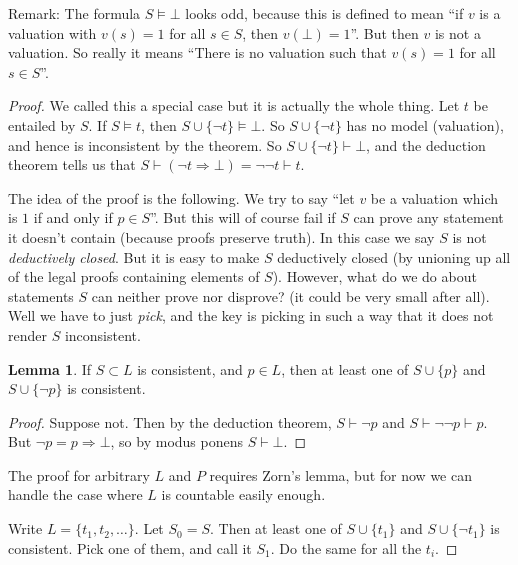 \documentclass{article}
\theoremstyle{definition}
\newtheorem{lemma}{Lemma}
\numberwithin{definition}{section}
\newcommand{\entails}{\models}
\newcommand{\proves}{\vdash}
\begin{document}
  Remark: The formula $S \entails \bot$ looks odd, because this is 
defined to mean ``if $v$ is a valuation with $v(s)=1$ for all $s \in S$, then 
$v(\bot)=1$''. But then $v$ is not a valuation. So really it means ``There is 
no valuation such that $v(s)=1$ for all $s \in S$''.

\begin{proof}
We called this a special case but it is actually the whole thing. 
  Let $t$ be entailed by $S$. 
  If $S \entails t$, then $S \cup \{\neg t\} \entails \bot$. 
  So $S \cup \{\neg t\}$ has no model (valuation), and hence is 
  inconsistent by the theorem. So $S \cup \{\neg t\} \proves \bot$, 
  and the deduction theorem tells us that 
  $S \proves (\neg t \Rightarrow \bot) = \neg \neg t \proves t$. 

The idea of the proof is the following. We try to say ``let $v$ be a valuation 
  which is $1$ if and only if $p \in S$''. But this will of course fail if $S$ 
  can prove any statement it doesn't contain (because proofs preserve truth). 
  In this case we say $S$ is not \textit{deductively closed}. But it is easy to 
  make $S$ deductively closed (by unioning up all of the legal proofs 
  containing elements of $S$). However, what do we do about statements $S$ can 
  neither prove nor disprove? (it could be very small after all). Well we have 
  to just \textit{pick}, and the key is picking in such a way that it does not 
  render $S$ inconsistent. 

\begin{lemma}
If $S \subset L$ is consistent, and $p \in L$, then at least one of 
  $S \cup \{p\}$ and $S \cup \{\neg p\}$ is consistent. 
\end{lemma} 

\begin{proof}
Suppose not. Then by the deduction theorem, 
  $S \proves \neg p$ and $S \proves \neg \neg p \proves p$. 
  But $\neg p = p \Rightarrow \bot$, so by modus ponens $S \proves \bot$. 
\end{proof}

The proof for arbitrary $L$ and $P$ requires Zorn's lemma, 
  but for now we can handle the case where $L$ is countable easily enough. 
  
  Write $L = \{t_{1},t_{2},\ldots\}$. 
  Let $S_{0} = S$. Then at least one of 
  $S \cup \{t_{1}\}$ and $S \cup \{\neg t_{1}\}$ 
  is consistent. 
  Pick one of them, and call it $S_{1}$. Do the same for all the $t_{i}$. 


\end{proof}
\end{document}
